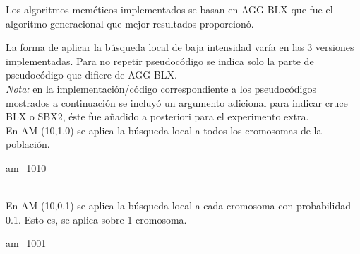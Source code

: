 \documentclass[11pt,a4paper]{article}
\DeclareMathOperator*{\argmax}{arg\,max}
\theoremstyle{definition}
\begin{document}
	Los algoritmos meméticos implementados se basan en AGG-BLX que fue el algoritmo generacional que mejor resultados proporcionó. 
	
	La forma de aplicar la búsqueda local de baja intensidad varía en las 3 versiones implementadas. Para no repetir pseudocódigo se indica solo la parte de pseudocódigo que difiere de AGG-BLX.~\\
	
	\textit{Nota:} en la implementación/código correspondiente a los pseudocódigos mostrados a continuación se incluyó un argumento adicional para indicar cruce BLX o SBX2, éste fue añadido a posteriori para el experimento extra.~\\
	
	En AM-(10,1.0) se aplica la búsqueda local a todos los cromosomas de la población.\\
	
	\begin{algorithm}[H]
		\caption{am\_1010}
			
	\end{algorithm}~\\
	
	En AM-(10,0.1) se aplica la búsqueda local a cada cromosoma con probabilidad 0.1. Esto es, se aplica sobre 1 cromosoma.\\
	
	\begin{algorithm}[H]
		\caption{am\_1001}
		\Begin{
			$pop\_size \leftarrow 10$
			
			$\ldots$
			
			$cross\_type\leftarrow  blx\_cross$
			
			$\ldots$
			
			\While{$evals < 15000$}{
			
			$\ldots$
			
			\If{$generation \% 10 == 0$}{
				$li\_ls(training,\ population[random(0,\ pop\_size-1),\ evals)$
			}
			
			}
			$\ldots$
			}
			
	\end{algorithm}~\\
	
\end{document}
